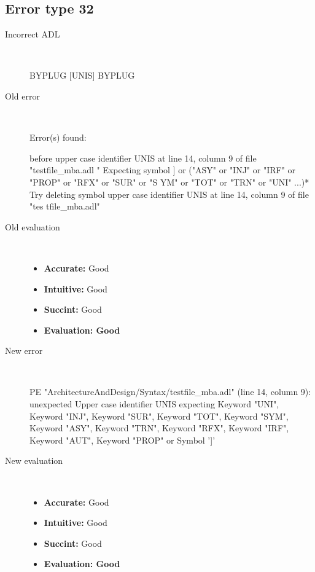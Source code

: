 \subsection{Error type 32}
  \begin{description}
  \item[Incorrect ADL]~\\
\begin{adl}
BYPLUG [UNIS] BYPLUG\end{adl}
  \item[Old error]~\\
\begin{haskell}
Error(s) found:

before upper case identifier UNIS at line 14, column 9 of file "testfile_mba.adl
"
Expecting symbol ] or ("ASY" or "INJ" or "IRF" or "PROP" or "RFX" or "SUR" or "S
YM" or "TOT" or "TRN" or "UNI" ...)*
Try deleting symbol upper case identifier UNIS at line 14, column 9 of file "tes
tfile_mba.adl"
\end{haskell}
  \item[Old evaluation]~\\
    \begin{itemize}
    \item \textbf{Accurate:} Good
    \item \textbf{Intuitive:} Good
    \item \textbf{Succint:} Good
    \item \textbf{Evaluation: Good}
    \end{itemize}
  \item[New error]~\\
\begin{haskell}
PE "ArchitectureAndDesign/Syntax/testfile_mba.adl" (line 14, column 9):
unexpected Upper case identifier UNIS
expecting Keyword "UNI", Keyword "INJ", Keyword "SUR", Keyword "TOT", Keyword "SYM", Keyword "ASY", Keyword "TRN", Keyword "RFX", Keyword "IRF", Keyword "AUT", Keyword "PROP" or Symbol ']'
\end{haskell}
  \item[New evaluation]~\\
    \begin{itemize}
    \item \textbf{Accurate:} Good
    \item \textbf{Intuitive:} Good
    \item \textbf{Succint:} Good
    \item \textbf{Evaluation: Good
}
    \end{itemize}
  \end{description}


